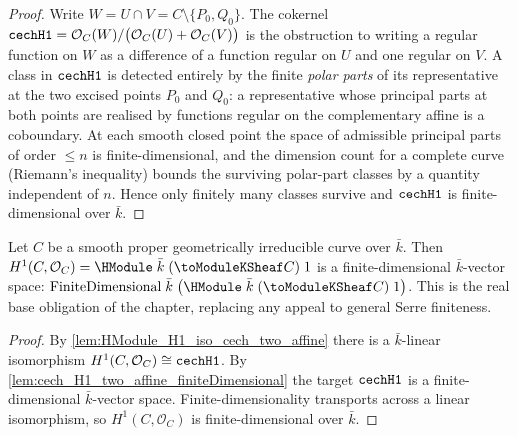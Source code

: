 \begin{proof}
  Write \(W = U \cap V = C \setminus \{P_0, Q_0\}\). The cokernel
  \(\mathtt{cechH1} = \mathcal O_C(W) / \bigl(\mathcal O_C(U) + \mathcal
  O_C(V)\bigr)\) is the obstruction to writing a regular function on
  \(W\) as a difference of a function regular on \(U\) and one regular
  on \(V\). A class in \(\mathtt{cechH1}\) is detected entirely by the finite
  \emph{polar parts} of its representative at the two excised points
  \(P_0\) and \(Q_0\): a representative whose principal parts at both
  points are realised by functions regular on the complementary affine
  is a coboundary. At each smooth closed point the space of admissible
  principal parts of order \(\le n\) is finite-dimensional, and the
  dimension count for a complete curve (Riemann's inequality) bounds the
  surviving polar-part classes by a quantity independent of \(n\). Hence
  only finitely many classes survive and \(\mathtt{cechH1}\) is
  finite-dimensional over \(\bar k\).

\end{proof}

\begin{lemma}
  \label{lem:HModule_structureSheaf_H1_finite}
  Let \(C\) be a smooth proper geometrically irreducible curve over
  \(\bar k\). Then \(H^1(C, \mathcal O_C) =
  \HModule\;\bar k\;(\toModuleKSheaf C)\;1\) is a finite-dimensional
  \(\bar k\)-vector space:
  \(\FiniteDimensional\;\bar k\;\bigl(\HModule\;\bar k\;
  (\toModuleKSheaf C)\;1\bigr)\). This is the real base obligation of
  the chapter, replacing any appeal to general Serre finiteness.
\end{lemma}

\begin{proof}
  By \cref{lem:HModule_H1_iso_cech_two_affine} there is a
  \(\bar k\)-linear isomorphism \(H^1(C, \mathcal O_C) \cong \mathtt{cechH1}\).
  By \cref{lem:cech_H1_two_affine_finiteDimensional} the target
  \(\mathtt{cechH1}\) is a finite-dimensional \(\bar k\)-vector space.
  Finite-dimensionality transports across a linear isomorphism, so
  \(H^1(C, \mathcal O_C)\) is finite-dimensional over \(\bar k\).
\end{proof}

